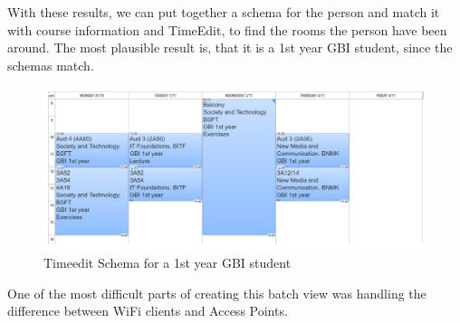 With these results, we can put together a schema for the person and match it with course information and TimeEdit, to find the rooms the person have been around. The most plausible result is, that it is a 1st year GBI student, since the schemas match.

\begin{figure}[p]
	\centering
	\includegraphics[width=\linewidth]{figures/schema-from-timeedit.png}
	\caption{Timeedit Schema for a 1st year GBI student}
	\label{fig:timeedit_schema}
\end{figure}

One of the most difficult parts of creating this batch view was handling the difference between WiFi clients and Access Points. 
